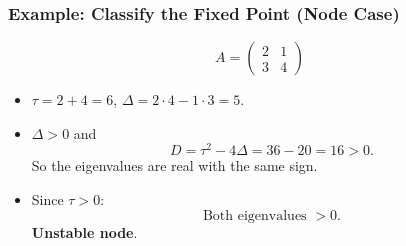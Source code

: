 \documentclass{beamer}
\begin{document}
\begin{frame}
  \frametitle{Example: Classify the Fixed Point (Node Case)}

  \[
    A=\begin{pmatrix} 2 & 1 \\ 3 & 4 \end{pmatrix}
  \]

  \begin{itemize}
    \item $\tau = 2+4 = 6$, \quad $\Delta = 2\cdot4 - 1\cdot3 = 5$.
    \item $\Delta>0$ and
      \[
        D=\tau^2 - 4\Delta = 36 - 20 = 16 > 0.
      \]
      So the eigenvalues are real with the same sign.
    \item Since $\tau>0$:
      \[
        \text{Both eigenvalues } >0.
      \]
      \textbf{Unstable node}.
  \end{itemize}

\end{frame}
\end{document}
